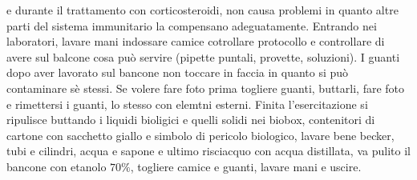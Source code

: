 e durante il trattamento con corticosteroidi, non causa problemi in quanto altre parti del sistema immunitario la compensano adeguatamente. Entrando nei laboratori, lavare mani indossare
camice cotrollare protocollo e controllare di avere sul balcone cosa pu\`o servire (pipette puntali, provette, soluzioni). I guanti dopo aver lavorato sul bancone non toccare in faccia
in quanto si pu\`o contaminare s\`e stessi. Se volere fare foto prima togliere guanti, buttarli, fare foto e rimettersi i guanti, lo stesso con elemtni esterni. Finita l'esercitazione si
ripulisce buttando i liquidi bioligici e quelli solidi nei biobox, contenitori di cartone con sacchetto giallo e simbolo di pericolo biologico, lavare bene becker, tubi e cilindri, 
acqua e sapone e ultimo risciacquo con acqua distillata, va pulito il bancone con etanolo $70\%$, togliere camice e guanti, lavare mani e uscire. 
